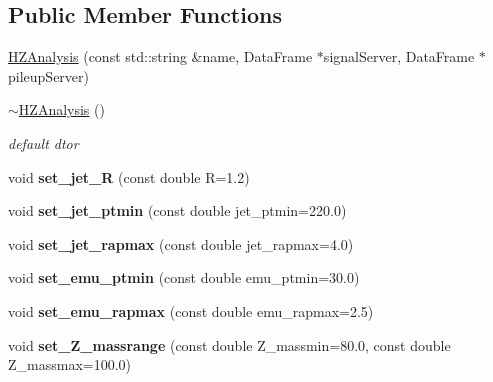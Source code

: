 \subsection*{Public Member Functions}
\begin{CompactItemize}
\item 
\hyperlink{classHZAnalysis_9660d265c62a0c30f6cfdbf6ac8abcf3}{HZAnalysis} (const std::string \&name, Data\-Frame $\ast$signal\-Server, Data\-Frame $\ast$pileup\-Server)
\item 
\hypertarget{classHZAnalysis_3a15a36771f970c088687a70ed0304f0}{
\hyperlink{classHZAnalysis_3a15a36771f970c088687a70ed0304f0}{$\sim$HZAnalysis} ()}
\label{classHZAnalysis_3a15a36771f970c088687a70ed0304f0}

\begin{CompactList}\small\item\em default dtor \item\end{CompactList}\item 
\hypertarget{classHZAnalysis_b43d737c402fd85b3555e00af1db0965}{
void \textbf{set\_\-jet\_\-R} (const double R=1.2)}
\label{classHZAnalysis_b43d737c402fd85b3555e00af1db0965}

\item 
\hypertarget{classHZAnalysis_33dbcb6b5cb1e9dd227ad00cebeea1f8}{
void \textbf{set\_\-jet\_\-ptmin} (const double jet\_\-ptmin=220.0)}
\label{classHZAnalysis_33dbcb6b5cb1e9dd227ad00cebeea1f8}

\item 
\hypertarget{classHZAnalysis_f2b81e2d51cd3f3e3bb941f2765ee822}{
void \textbf{set\_\-jet\_\-rapmax} (const double jet\_\-rapmax=4.0)}
\label{classHZAnalysis_f2b81e2d51cd3f3e3bb941f2765ee822}

\item 
\hypertarget{classHZAnalysis_6be8f24f8aa47bb06a5593703bea93cd}{
void \textbf{set\_\-emu\_\-ptmin} (const double emu\_\-ptmin=30.0)}
\label{classHZAnalysis_6be8f24f8aa47bb06a5593703bea93cd}

\item 
\hypertarget{classHZAnalysis_f0bdbdb234b6109a8cf3aca6958b92f7}{
void \textbf{set\_\-emu\_\-rapmax} (const double emu\_\-rapmax=2.5)}
\label{classHZAnalysis_f0bdbdb234b6109a8cf3aca6958b92f7}

\item 
\hypertarget{classHZAnalysis_40752f6bcfc5dc80d321ee31884ca833}{
void \textbf{set\_\-Z\_\-massrange} (const double Z\_\-massmin=80.0, const double Z\_\-massmax=100.0)}
\label{classHZAnalysis_40752f6bcfc5dc80d321ee31884ca833}


\end{CompactItemize}
